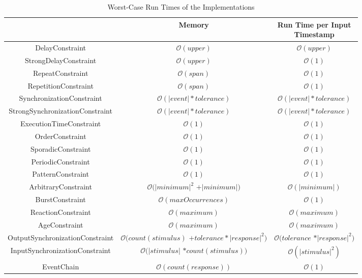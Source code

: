 	\begin{table}
		\begin{tabular}{|c|c|c|}
			\hline
			& Memory & \makecell{Run Time per Input\\Timestamp} \\
			\hline
			{DelayConstraint} & $\mathcal{O}(upper)$ & $\mathcal{O}(upper)$ \\
			\hline
			{StrongDelayConstraint} &  $\mathcal{O}(upper)$ &  $\mathcal{O}(1)$ \\
			\hline
			{RepeatConstraint} & $\mathcal{O}(span)$ & $\mathcal{O}(1)$ \\
			\hline
			{RepetitionConstraint} & $\mathcal{O}(span)$ & $\mathcal{O}(1)$ \\
			\hline
			SynchronizationConstraint & $\mathcal{O}(|event|*tolerance)$ & $\mathcal{O}(|event|*tolerance)$ \\
			\hline
			StrongSynchronizationConstraint & $\mathcal{O}(|event|*tolerance)$ & $\mathcal{O}(|event|*tolerance)$ \\
			\hline
			ExecutionTimeConstraint & $\mathcal{O}(1)$ & $\mathcal{O}(1)$ \\
			\hline
			OrderConstraint & $\mathcal{O}(1)$ & $\mathcal{O}(1)$ \\
			\hline
			SporadicConstraint & $\mathcal{O}(1)$ & $\mathcal{O}(1)$ \\
			\hline
			PeriodicConstraint & $\mathcal{O}(1)$ & $\mathcal{O}(1)$ \\
			\hline
			PatternConstraint & $\mathcal{O}(1)$ & $\mathcal{O}(1)$ \\
			\hline
			ArbitraryConstraint & \makecell{$\mathcal{O}(|minimum|^2$\\$+|minimum|)$} & $\mathcal{O}(|minimum|)$\\
			\hline
			BurstConstraint & $\mathcal{O}(maxOccurrences)$ & $\mathcal{O}(1)$ \\
			\hline
			ReactionConstraint & $\mathcal{O}(maximum)$ & $\mathcal{O}(maximum)$ \\
			\hline
			AgeConstraint & $\mathcal{O}(maximum)$ & $\mathcal{O}(maximum)$ \\
			\hline
			OutputSynchronizationConstraint& \makecell{$\mathcal{O}(count(stimulus)$\\$+tolerance*|response|^2)$} &  \makecell{$\mathcal{O}(tolerance$\\$*|response|^2)$}\\
			\hline
			InputSynchronizationConstraint& \makecell{$\mathcal{O}(|stimulus|$\\$*count(stimulus))$} & $\mathcal{O}(|stimulus|^2)$ \\
			\hline
			EventChain & $\mathcal{O}(count(response))$ & $\mathcal{O}(1)$\\
			\hline
		\end{tabular}
		\centering
		\label{tab:complexityClasses}
		\caption{Worst-Case Run Times of the Implementations}
	\end{table}

	
	
